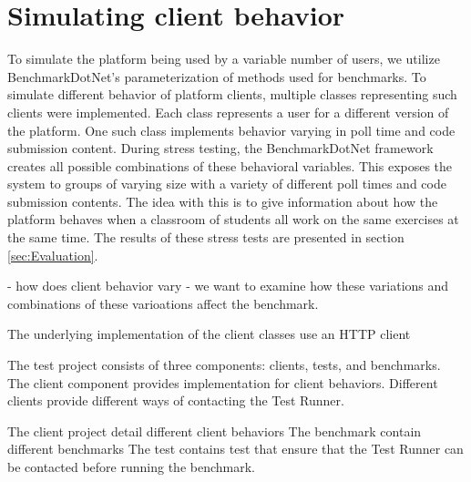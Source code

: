 
\section{Simulating client behavior}
To simulate the platform being used by a variable number of users, we utilize BenchmarkDotNet's parameterization of methods used for benchmarks. 
To simulate different behavior of platform clients, multiple classes representing such clients were implemented.
Each class represents a user for a different version of the platform.
One such class implements behavior varying in poll time and code submission content.
During stress testing, the BenchmarkDotNet framework creates all possible combinations of these behavioral variables.
This exposes the system to groups of varying size with a variety of different poll times and code submission contents.
The idea with this is to give information about how the platform behaves when a classroom of students all work on the same exercises at the same time.
The results of these stress tests are presented in section \ref{sec:Evaluation}.

- how does client behavior vary
- we want to examine how these variations and combinations  of these varioations affect the benchmark. 

The underlying implementation of the client classes use an HTTP client

The test project consists of three components: clients, tests, and benchmarks.
The client component provides implementation for client behaviors. Different clients provide different ways of contacting the Test Runner.

The client project detail different client behaviors
The benchmark contain different benchmarks
The test contains test that ensure that the Test Runner can be contacted before running the benchmark.